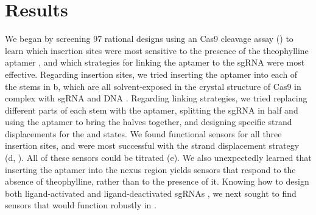 \documentclass[10pt,oneside]{article}
\begin{document}
\section{Results}





We began by screening 97 rational designs using an \invitro{} Cas9 cleavage assay () to learn which insertion sites were most sensitive to the presence of the theophylline aptamer \autocite{jenison1994}, and which strategies for linking the aptamer to the sgRNA were most effective.  Regarding insertion sites, we tried inserting the aptamer into each of the stems in b, which are all solvent-exposed in the crystal structure of Cas9 in complex with sgRNA and DNA \autocite{nishimasu2014}.  Regarding linking strategies, we tried replacing different parts of each stem with the aptamer, splitting the sgRNA in half and using the aptamer to bring the halves together, and designing specific strand displacements for the \apo{} and \holo{} states.  We found functional sensors for all three insertion sites, and were most successful with the strand displacement strategy (d, ).  All of these sensors could be titrated (e).  We also unexpectedly learned that inserting the aptamer into the nexus region yields sensors that respond to the absence of theophylline, rather than to the presence of it.  Knowing how to design both ligand-activated and ligand-deactivated sgRNAs \invitro{}, we next sought to find sensors that would function robustly in \ecoli{}.
% 
% 
% 
% 
% 
% 
\end{document}
